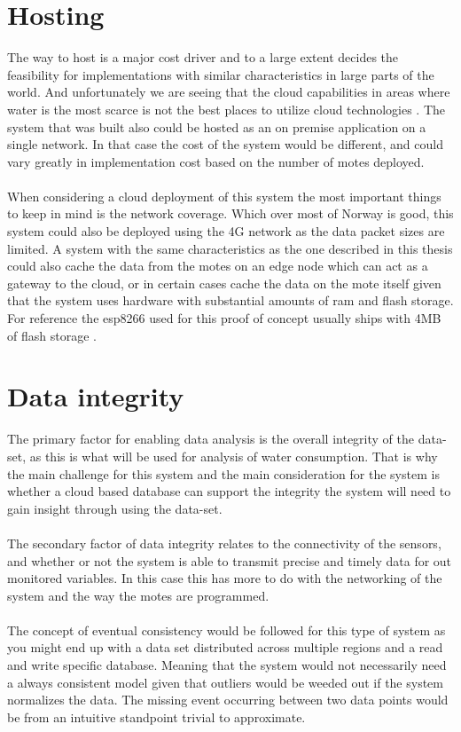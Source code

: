 \documentclass[]{uiophd}
\begin{document}
\section{Hosting}
The way to host is a major cost driver and to a large extent decides the feasibility for implementations with similar characteristics in large parts of the world. And unfortunately we are seeing that the cloud capabilities in areas where water is the most scarce is not the best places to utilize cloud technologies \cite{awsregions}. The system that was built also could be hosted as an on premise application on a single network. In that case the cost of the system would be different, and could vary greatly in implementation cost based on the number of motes deployed.
\\\\
When considering a cloud deployment of this system the most important things to keep in mind is the network coverage. Which over most of Norway is good, this system could also be deployed using the 4G network as the data packet sizes are limited. A system with the same characteristics as the one described in this thesis could also cache the data from the motes on an edge node which can act as a gateway to the cloud, or in certain cases cache the data on the mote itself given that the system uses hardware with substantial amounts of ram and flash storage. For reference the esp8266 \cite{espressif} used for this proof of concept usually ships with 4MB of flash storage \cite{espressif}.

\section{Data integrity}
The primary factor for enabling data analysis is the overall integrity of the data-set, as this is what will be used for analysis of water consumption. That is why the main challenge for this system and the main consideration for the system is whether a cloud based database can support the integrity the system will need to gain insight through using the data-set. 
\\\\
The secondary factor of data integrity relates to the connectivity of the sensors, and whether or not the system is able to transmit precise and timely data for out monitored variables. In this case this has  more to do with the networking of the system and the way the motes are programmed.
\\\\
The concept of eventual consistency would be followed for this type of system as you might end up with a data set distributed across multiple regions and a read and write specific database. Meaning that the system would not necessarily need a always consistent model given that outliers would be weeded out if the system normalizes the data. The missing event occurring between two data points would be from an intuitive standpoint trivial to approximate.
\end{document}
